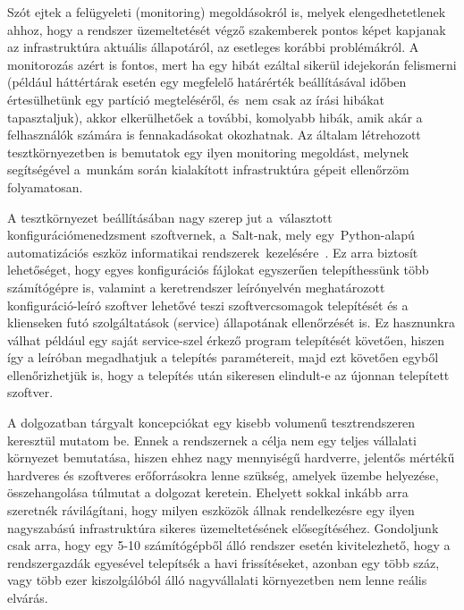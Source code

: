 Szót ejtek a felügyeleti (monitoring) megoldásokról is, melyek elengedhetetlenek ahhoz, hogy a rendszer üzemeltetését végző szakemberek pontos képet kapjanak az infrastruktúra aktuális állapotáról, az esetleges korábbi problémákról. A monitorozás azért is fontos, mert ha egy hibát ezáltal sikerül idejekorán felismerni (például háttértárak esetén egy megfelelő határérték beállításával időben értesülhetünk egy partíció megteléséről, és~nem csak az írási hibákat tapasztaljuk), akkor elkerülhetőek a további, komolyabb hibák, amik akár a felhasználók számára is fennakadásokat okozhatnak. Az általam létrehozott tesztkörnyezetben is bemutatok egy ilyen monitoring megoldást, melynek segítségével a~munkám során kialakított infrastruktúra gépeit ellenőrzöm folyamatosan.

A tesztkörnyezet beállításában nagy szerep jut a~választott konfigurációmenedzsment szoftvernek, a~Salt-nak, mely egy~Python-alapú automatizációs eszköz informatikai rendszerek~kezelésére~\cite{SaltAbout}. Ez arra biztosít lehetőséget, hogy egyes konfigurációs \mbox{fájlokat} egyszerűen telepíthessünk több számítógépre is, valamint a keretrendszer leírónyelvén meghatározott konfiguráció-leíró szoftver lehetővé teszi szoftvercsomagok telepítését és a klienseken futó szolgáltatások (service) állapotának ellenőrzését is. Ez hasznunkra válhat például egy saját service-szel érkező program telepítését követően, hiszen így a leíróban megadhatjuk a telepítés paramétereit, majd ezt követően egyből ellenőrizhetjük is, hogy a telepítés után sikeresen elindult-e az újonnan telepített szoftver.


A dolgozatban tárgyalt koncepciókat egy kisebb volumenű tesztrendszeren keresztül mutatom be. Ennek a rendszernek a célja nem egy teljes vállalati környezet bemutatása, hiszen ehhez nagy mennyiségű hardverre, jelentős mértékű hardveres és szoftveres erőforrásokra lenne szükség, amelyek üzembe helyezése, összehangolása túlmutat a dolgozat keretein.
Ehelyett sokkal inkább arra szeretnék rávilágítani, hogy milyen eszközök állnak rendelkezésre egy ilyen nagyszabású infrastruktúra sikeres üzemeltetésének elősegítéséhez. Gondoljunk csak arra, hogy egy 5-10 számítógépből álló rendszer esetén kivitelezhető, hogy a rendszergazdák egyesével telepítsék a havi frissítéseket, azonban egy több száz, vagy több ezer kiszolgálóból álló nagyvállalati környezetben nem lenne reális elvárás.

